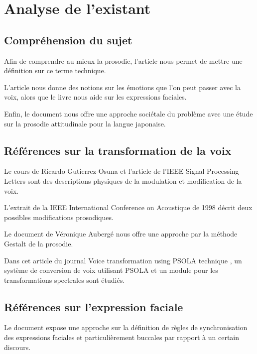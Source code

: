 \chapter{Analyse de l'existant}



\section{Compréhension du sujet}\label{comprehension_sujet}

Afin de comprendre au mieux la prosodie, l'article \cite{bachorowski1999vocal} nous permet de mettre une définition sur ce terme technique.

L'article \cite{auberge2002prosodie} nous donne des notions sur les émotions que l'on peut passer avec la voix, alors que le livre \cite{ekman2003unmasking} nous aide sur les expressions faciales.

Enfin, le document \cite{fourer:hal-00992083} nous offre une approche sociétale du problème avec une étude sur la prosodie attitudinale pour la langue japonaise.


\section{Références sur la transformation de la voix}\label{ref_transfo_voix}

Le cours de Ricardo Gutierrez-Osuna \cite{Gutierrez-Osuna:ISP-PMS} et l'article de l'IEEE Signal Processing Letters \cite{haagen1994transformation} sont des descriptions physiques de la modulation et modification de la voix.

L'extrait de la IEEE International Conference on Acoustique de 1998 \cite{Acero:ICASSP98-II-881} décrit deux possibles modifications prosodiques.

Le document de Véronique Aubergé \cite{auberge2002gestalt} nous offre une approche par la méthode Gestalt de la prosodie.

Dans cet article du journal Voice transformation using PSOLA technique \cite{valbret1992voice}, un système de conversion de voix utilisant PSOLA et un module pour les transformations spectrales sont étudiés.

\section{Références sur l'expression faciale}\label{ref_transfo_faciales}

Le document \cite{beskow1995rule} expose une approche sur la définition de règles de synchronisation des expressions faciales et particulièrement buccales par rapport à un certain discours.


